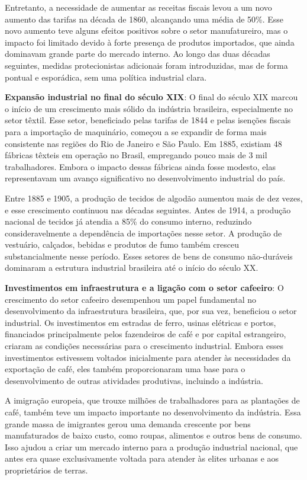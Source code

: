 \documentclass[a4paper,12pt]{article}[abntex2]
\begin{document}
Entretanto, a necessidade de aumentar as receitas fiscais levou a um novo aumento das tarifas na década de 1860, alcançando uma média de 50\%. Esse novo aumento teve alguns efeitos positivos sobre o setor manufatureiro, mas o impacto foi limitado devido à forte presença de produtos importados, que ainda dominavam grande parte do mercado interno. Ao longo das duas décadas seguintes, medidas protecionistas adicionais foram introduzidas, mas de forma pontual e esporádica, sem uma política industrial clara.

\textbf{Expansão industrial no final do século XIX}: O final do século XIX marcou o início de um crescimento mais sólido da indústria brasileira, especialmente no setor têxtil. Esse setor, beneficiado pelas tarifas de 1844 e pelas isenções fiscais para a importação de maquinário, começou a se expandir de forma mais consistente nas regiões do Rio de Janeiro e São Paulo. Em 1885, existiam 48 fábricas têxteis em operação no Brasil, empregando pouco mais de 3 mil trabalhadores. Embora o impacto dessas fábricas ainda fosse modesto, elas representavam um avanço significativo no desenvolvimento industrial do país.

Entre 1885 e 1905, a produção de tecidos de algodão aumentou mais de dez vezes, e esse crescimento continuou nas décadas seguintes. Antes de 1914, a produção nacional de tecidos já atendia a 85\% do consumo interno, reduzindo consideravelmente a dependência de importações nesse setor. A produção de vestuário, calçados, bebidas e produtos de fumo também cresceu substancialmente nesse período. Esses setores de bens de consumo não-duráveis dominaram a estrutura industrial brasileira até o início do século XX.

\textbf{Investimentos em infraestrutura e a ligação com o setor cafeeiro}: O crescimento do setor cafeeiro desempenhou um papel fundamental no desenvolvimento da infraestrutura brasileira, que, por sua vez, beneficiou o setor industrial. Os investimentos em estradas de ferro, usinas elétricas e portos, financiados principalmente pelos fazendeiros de café e por capital estrangeiro, criaram as condições necessárias para o crescimento industrial. Embora esses investimentos estivessem voltados inicialmente para atender às necessidades da exportação de café, eles também proporcionaram uma base para o desenvolvimento de outras atividades produtivas, incluindo a indústria.

A imigração europeia, que trouxe milhões de trabalhadores para as plantações de café, também teve um impacto importante no desenvolvimento da indústria. Essa grande massa de imigrantes gerou uma demanda crescente por bens manufaturados de baixo custo, como roupas, alimentos e outros bens de consumo. Isso ajudou a criar um mercado interno para a produção industrial nacional, que antes era quase exclusivamente voltada para atender às elites urbanas e aos proprietários de terras.
\end{document}
